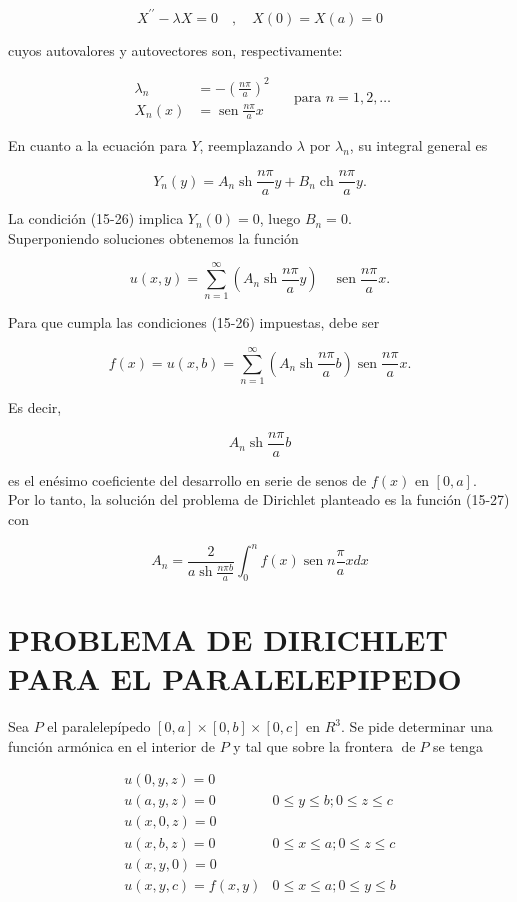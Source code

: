 \documentclass[10pt]{article}
\theoremstyle{plain}
\theoremstyle{definition}
\theoremstyle{remark}
\begin{document}
$$
X^{\prime \prime}-\lambda X=0 \quad, \quad X(0)=X(a)=0
$$

cuyos autovalores y autovectores son, respectivamente:

$$
\begin{aligned}
\lambda_{n} & =-\left(\frac{n \pi}{a}\right)^{2} \\
X_{n}(x) & =\operatorname{sen} \frac{n \pi}{a} x
\end{aligned} \quad \text { para } n=1,2, \ldots
$$

En cuanto a la ecuación para $Y$, reemplazando $\lambda$ por $\lambda_{n}$, su integral general es

$$
Y_{n}(y)=A_{n} \operatorname{sh} \frac{n \pi}{a} y+B_{n} \operatorname{ch} \frac{n \pi}{a} y .
$$

La condición (15-26) implica $Y_{n}(0)=0$, luego $B_{n}=0$.\\
Superponiendo soluciones obtenemos la función


\begin{equation*}
u(x, y)=\sum_{n=1}^{\infty}\left(A_{n} \operatorname{sh} \frac{n \pi}{a} y\right) \quad \operatorname{sen} \frac{n \pi}{a} x . \tag{15-27}
\end{equation*}


Para que cumpla las condiciones (15-26) impuestas, debe ser

$$
f(x)=u(x, b)=\sum_{n=1}^{\infty}\left(A_{n} \operatorname{sh} \frac{n \pi}{a} b\right) \operatorname{sen} \frac{n \pi}{a} x .
$$

Es decir,

$$
A_{n} \operatorname{sh} \frac{n \pi}{a} b
$$

es el enésimo coeficiente del desarrollo en serie de senos de $f(x)$ en $[0, a]$.\\
Por lo tanto, la solución del problema de Dirichlet planteado es la función (15-27) con

$$
A_{n}=\frac{2}{a \operatorname{sh} \frac{n \pi b}{a}} \int_{0}^{n} f(x) \operatorname{sen} n \frac{\pi}{a} x d x
$$

\section*{PROBLEMA DE DIRICHLET PARA EL PARALELEPIPEDO}
Sea $P$ el paralelepípedo $[0, a] \times[0, b] \times[0, c]$ en $R^{3}$. Se pide determinar una función armónica en el interior de $P$ y tal que sobre la frontera $\operatorname{de} P$ se tenga

\[
\begin{array}{ll}
u(0, y, z)=0 & \\
u(a, y, z)=0 & 0 \leqslant y \leqslant b ; 0 \leqslant z \leqslant c \\
u(x, 0, z)=0 & \\
u(x, b, z)=0 & 0 \leqslant x \leqslant a ; 0 \leqslant z \leqslant c \\
u(x, y, 0)=0 & \\
u(x, y, c)=f(x, y) & 0 \leqslant x \leqslant a ; 0 \leqslant y \leqslant b \tag{15-29}
\end{array}
\]
\end{document}
